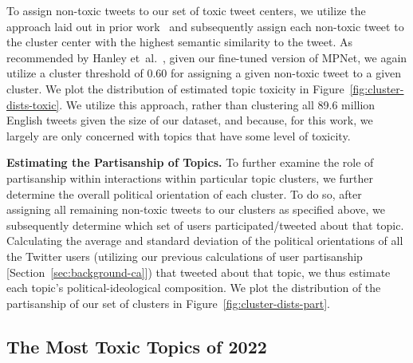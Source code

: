 To assign non-toxic tweets to our set of toxic tweet centers, we utilize the approach laid out in prior work~\cite{hanley2022happenstance,hanley2023partial} and subsequently assign each non-toxic tweet to the cluster center with the highest semantic similarity to the tweet. As recommended by Hanley {et~al.}~\cite{hhanleyspecious2024}, given our fine-tuned version of MPNet, we again utilize a cluster threshold of 0.60 for assigning a given non-toxic tweet to a given cluster. We plot the distribution of estimated topic toxicity in Figure~\ref{fig:cluster-dists-toxic}. We utilize this approach, rather than clustering all 89.6 million English tweets given the size of our dataset, and because, for this work, we largely are only concerned with topics that have some level of toxicity. 

\vspace{2pt}\noindent
\noindent
\textbf{Estimating the Partisanship of Topics.}
To further examine the role of partisanship within interactions within particular topic clusters, we further determine the overall political orientation of each cluster. To do so, after assigning all remaining non-toxic tweets to our clusters as specified above, we subsequently determine which set of users participated/tweeted about that topic. Calculating the average and standard deviation of the political orientations of all the Twitter users (utilizing our previous calculations of user partisanship [Section~\ref{sec:background-ca}]) that tweeted about that topic, we thus estimate each topic's political-ideological composition. We plot the distribution of the partisanship of our set of clusters in Figure~\ref{fig:cluster-dists-part}. 


\subsection{The Most Toxic Topics of 2022\label{sec:most-toxic}}

